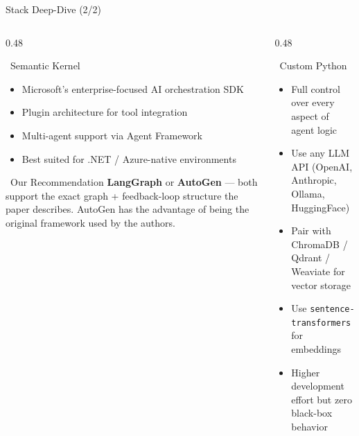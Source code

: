 \documentclass[aspectratio=169]{beamer}
\begin{document}
\begin{frame}{Stack Deep-Dive (2/2)}
  \begin{columns}[T]
    \begin{column}{0.48\textwidth}
      \vspace{0.3cm}
      \begin{block}{\faMicrosoft\ Semantic Kernel}
        \small
        \begin{itemize}
          \item Microsoft's enterprise-focused AI orchestration SDK
          \item Plugin architecture for tool integration
          \item Multi-agent support via Agent Framework
          \item Best suited for .NET / Azure-native environments
        \end{itemize}
      \end{block}
            \begin{alertblock}{\faStar\ Our Recommendation}
        \small
        \textbf{LangGraph} or \textbf{AutoGen} — both support the exact graph + feedback-loop structure the paper describes. AutoGen has the advantage of being the original framework used by the authors.
      \end{alertblock}

    \end{column}
    \begin{column}{0.48\textwidth}
      \begin{block}{\faPython\ Custom Python}
        \small
        \begin{itemize}
          \item Full control over every aspect of agent logic
          \item Use any LLM API (OpenAI, Anthropic, Ollama, HuggingFace)
          \item Pair with ChromaDB / Qdrant / Weaviate for vector storage
          \item Use \texttt{sentence-transformers} for embeddings
          \item Higher development effort but zero black-box behavior
        \end{itemize}
      \end{block}
      \vspace{0.3cm}
    \end{column}
  \end{columns}
\end{frame}
\end{document}

